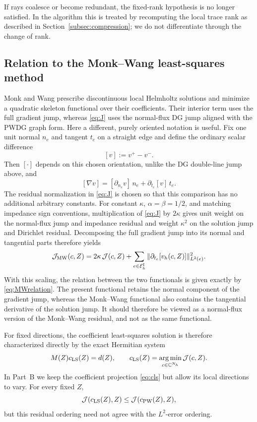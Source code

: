 \documentclass[pdflatex,sn-mathphys-num]{sn-jnl}
\theoremstyle{thmstyleone}
\theoremstyle{thmstyletwo}
\newcommand{\C}{\mathbb C}
\newcommand{\Ei}{\mathcal E_h^{\rm I}}
\newcommand{\sjump}[1]{[#1]}
\begin{document}
If rays coalesce or become redundant, the fixed-rank hypothesis is no longer satisfied.  In the algorithm this is treated by recomputing the local trace rank as described in Section~\ref{subsec:compression}; we do not differentiate through the change of rank.

\subsection{Relation to the Monk--Wang least-squares method}\label{subsec:monkwang}
Monk and Wang \cite{MonkWang1999} prescribe discontinuous local Helmholtz solutions and minimize a quadratic skeleton functional over their coefficients.  Their interior term uses the full gradient jump, whereas \eqref{eq:J} uses the normal-flux DG jump aligned with the PWDG graph form.  Here a different, purely oriented notation is useful.  Fix one unit normal $n_e$ and tangent $t_e$ on a straight edge and define the ordinary scalar difference
\[
 \sjump{v}:=v^+-v^-.
\]
Then $\sjump{\cdot}$ depends on this chosen orientation, unlike the DG double-line jump above, and
\[
 \sjump{\nabla v}=\sjump{\partial_{n_e}v}\,n_e+\partial_{t_e}\sjump{v}\,t_e.
\]
The residual normalization in \eqref{eq:J} is chosen so that this comparison has no additional arbitrary constants.  For constant $\kappa$, $\alpha=\beta=1/2$, and matching impedance sign conventions, multiplication of \eqref{eq:J} by $2\kappa$ gives unit weight on the normal-flux jump and impedance residual and weight $\kappa^2$ on the solution jump and Dirichlet residual.  Decomposing the full gradient jump into its normal and tangential parts therefore yields
\begin{equation}\label{eq:MWrelation}
 {\mathcal J_{\rm MW}(c,Z)
 =2\kappa\,\mathcal J(c,Z)
 +\sum_{e\in\Ei}\|\partial_{t_e}\sjump{v_h(c,Z)}\|_{L^2(e)}^2.}
\end{equation}
With this scaling, the relation between the two functionals is given exactly by \eqref{eq:MWrelation}.  The present functional retains the normal component of the gradient jump, whereas the Monk--Wang functional also contains the tangential derivative of the solution jump.  It should therefore be viewed as a normal-flux version of the Monk--Wang residual, and not as the same functional.

For fixed directions, the coefficient least-squares solution is therefore characterized directly by the exact Hermitian system
\begin{equation}\label{eq:cls}
 M(Z)c_{\rm LS}(Z)=d(Z),
 \qquad
 c_{\rm LS}(Z)=\operatorname*{arg\,min}_{c\in\C^{N_h}}\mathcal J(c,Z).
\end{equation}
In Part~B we keep the coefficient projection \eqref{eq:cls} but allow its local directions to vary.  For every fixed $Z$,
\begin{equation}\label{eq:LSdominatesJ}
 \mathcal J(c_{\rm LS}(Z),Z)
 \le \mathcal J(c_{\rm PW}(Z),Z),
\end{equation}
but this residual ordering need not agree with the $L^2$-error ordering.
\end{document}
